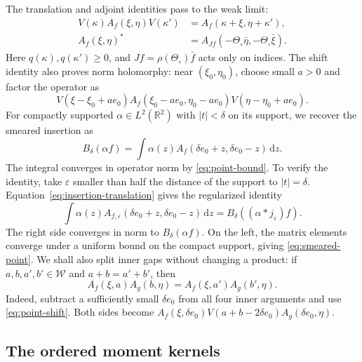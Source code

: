 \documentclass[11pt, letterpaper, reqno]{amsart}
\theoremstyle{definition}
\theoremstyle{remark}
\newcommand{\bbR}{\mathbb{R}}
\newcommand{\calW}{\mathcal{W}}
\newcommand{\dd}{\,\mathrm{d}}
\begin{document}
The translation and adjoint identities pass to the weak limit:
\begin{align}
 V(\kappa)A_f(\xi,\eta)V(\kappa')
   &=A_f(\kappa+\xi,\eta+\kappa'),\label{eq:point-shift}\\
 A_f(\xi,\eta)^*&=A_{Jf}(-\Theta_\circ\bar\eta,
                                      -\Theta_\circ\bar\xi).
 \label{eq:point-adjoint}
\end{align}
Here $q(\kappa),q(\kappa')\geq0$, and $Jf=\rho(\Theta_\circ)\bar f$
acts only on indices. The shift identity also proves norm holomorphy:
near $(\xi_0,\eta_0)$, choose small $a>0$ and factor the operator as
\begin{equation}
 V(\xi-\xi_0+ae_0)A_f(\xi_0-ae_0,\eta_0-ae_0)
          V(\eta-\eta_0+ae_0).
\end{equation}
For compactly supported $\alpha\in L^2(\bbR^2)$ with $|t|<\delta$
on its support, we recover the smeared insertion as
\begin{equation}\label{eq:smeared-point}
 B_\delta(\alpha f)=\int\alpha(z)
               A_f(\delta e_0+z,\delta e_0-z)\dd z.
\end{equation}
The integral converges in operator norm by \eqref{eq:point-bound}.
To verify the identity, take $\varepsilon$ smaller than half the distance
of the support to $|t|=\delta$. Equation~\eqref{eq:insertion-translation}
gives the regularized identity
\begin{equation}
 \int\alpha(z)A_{f,\varepsilon}(\delta e_0+z,\delta e_0-z)\dd z
       =B_\delta((\alpha*j_\varepsilon)f).
\end{equation}
The right side converges in norm to $B_\delta(\alpha f)$.
On the left, the matrix elements converge under a uniform bound
on the compact support, giving \eqref{eq:smeared-point}.
We shall also split inner gaps without changing a
product: if $a,b,a',b'\in\calW$ and $a+b=a'+b'$, then
\begin{equation}\label{eq:gap-splitting}
 A_f(\xi,a)A_g(b,\eta)=A_f(\xi,a')A_g(b',\eta).
\end{equation}
Indeed, subtract a sufficiently small $\delta e_0$ from all four inner
arguments and use \eqref{eq:point-shift}. Both sides become
$A_f(\xi,\delta e_0)V(a+b-2\delta e_0)A_g(\delta e_0,\eta)$.

\subsection{The ordered moment kernels}\label{subsec:ordered}
\end{document}
